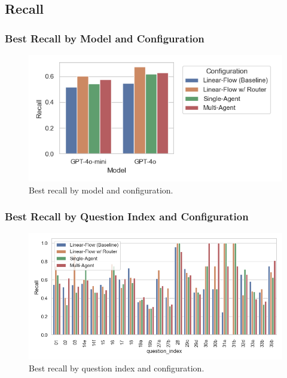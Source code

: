             
        \subsection{Recall}


            \subsubsection{Best Recall by Model and Configuration}
            \begin{figure}[H]
                \centering
                \includegraphics[scale=0.75]{images_exp2/recall/bar_best_recall_by_model_and_configuration.png}
                \caption{Best recall by model and configuration.}
                \label{fig:bar_best_recall_by_model_and_configuration}
            \end{figure}

            \subsubsection{Best Recall by Question Index and Configuration}
            \begin{figure}[H]
                \centering
                \includegraphics[scale=0.75]{images_exp2/recall/best_recall_by_question_index_and_configuration.png}
                \caption{Best recall by question index and configuration.}
                \label{fig:best_recall_by_question_index_and_configuration}
            \end{figure}

